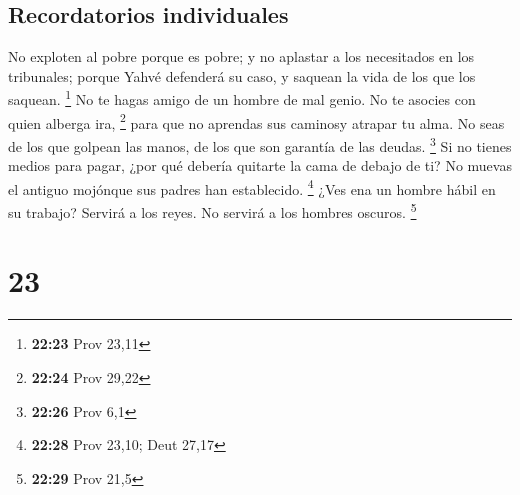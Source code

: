 \hypertarget{recordatorios-individuales}{%
\subsection{Recordatorios
individuales}\label{recordatorios-individuales}}

 No exploten al pobre porque es pobre; y no aplastar a
los necesitados en los tribunales;  porque Yahvé
defenderá su caso, y saquean la vida de los que los saquean. \footnote{\textbf{22:23}
  Prov 23,11}  No te hagas amigo de un hombre de mal
genio. No te asocies con quien alberga ira, \footnote{\textbf{22:24}
  Prov 29,22}  para que no aprendas sus caminosy atrapar
tu alma.  No seas de los que golpean las manos, de los
que son garantía de las deudas. \footnote{\textbf{22:26} Prov 6,1}
 Si no tienes medios para pagar, ¿por qué debería
quitarte la cama de debajo de ti?  No muevas el antiguo
mojónque sus padres han establecido. \footnote{\textbf{22:28} Prov
  23,10; Deut 27,17}  ¿Ves ena un hombre hábil en su
trabajo? Servirá a los reyes. No servirá a los hombres oscuros.
\footnote{\textbf{22:29} Prov 21,5}

\hypertarget{section-22}{%
\section{23}\label{section-22}}

